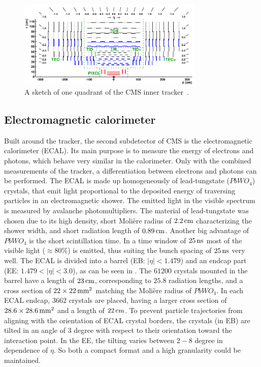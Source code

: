 \begin{figure}[tbp]
 \centering
 \includegraphics[width=0.79\textwidth]{figures/general/tracker.pdf}
 \caption{A sketch of one quadrant of the CMS inner tracker~\cite{TrackerPDFPic}.}
 \label{fig:tracker}
\end{figure}

\subsection{Electromagnetic calorimeter}
Built around the tracker, the second subdetector of CMS is the electromagnetic calorimeter (ECAL). Its main purpose is to measure the energy of electrons and photons, which behave very similar in the calorimeter. Only with the combined measurements of the tracker, a differentiation between electrons and photons can be performed. The ECAL is made up homogeneously of lead-tungstate ($PbWO_4$) crystals, that emit light proportional to the deposited energy of traversing particles in an electromagnetic shower. The emitted light in the visible spectrum is measured by avalanche photomultipliers. The material of lead-tungstate was chosen due to its high density, short Moli\`{e}re radius of $2.2\,\text{cm}$ characterizing the shower width, and short radiation length of $0.89\,\text{cm}$. Another big advantage of $PbWO_4$ is the short scintillation time. In a time window of $25\,\text{ns}$ most of the visible light ($\approx80\%$) is emitted, thus suiting the bunch spacing of $25\,\text{ns}$ very well. The ECAL is divided into a barrel (EB: $|\eta|<1.479$) and an endcap part (EE: $1.479<|\eta|<3.0$), as can be seen in . The $61200$ crystals mounted in the barrel have a length of $23\,\text{cm}$, corresponding to $25.8$ radiation lengths, and a cross section of $22\times22\,\text{mm}^2$ matching the Moli\`{e}re radius of $PbWO_4$. In each ECAL endcap, $3662$ crystals are placed, having a larger cross section of $ 28.6\times28.6\,\text{mm}^2$ and a length of $22\,\text{cm}$.
To prevent particle trajectories from aligning with the orientation of ECAL crystal borders, the crystals (in EB) are tilted in an angle of $3$ degree with respect to their orientation toward the interaction point. In the EE, the tilting varies between $2-8$ degree in dependence of $\eta$. So both a compact format and a high granularity could be maintained.\\
